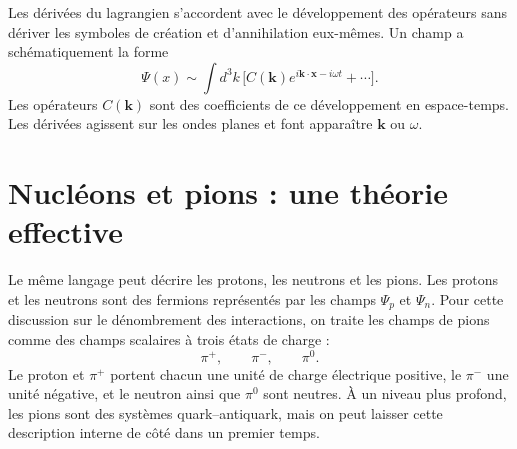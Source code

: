 \begin{classroomqa}
\end{classroomqa}

Les dérivées du lagrangien s’accordent avec le développement des opérateurs sans dériver les symboles de création et d’annihilation eux-mêmes. Un champ a schématiquement la forme
\begin{equation}
\Psi(x)
\sim
\int d^3k\,
\bigl[
C(\mathbf k)e^{i\mathbf k\cdot\mathbf x-i\omega t}
+\cdots
\bigr].
\end{equation}
Les opérateurs \(C(\mathbf k)\) sont des coefficients de ce développement en espace-temps. Les dérivées agissent sur les ondes planes et font apparaître \(\mathbf k\) ou \(\omega\).

\begin{classroomqa}
\end{classroomqa}

\section{Nucléons et pions : une théorie effective}

Le même langage peut décrire les protons, les neutrons et les pions. Les protons et les neutrons sont des fermions représentés par les champs \(\Psi_p\) et \(\Psi_n\). Pour cette discussion sur le dénombrement des interactions, on traite les champs de pions comme des champs scalaires à trois états de charge :
\begin{equation}
\pi^+,
\qquad
\pi^-,
\qquad
\pi^0.
\end{equation}
Le proton et \(\pi^+\) portent chacun une unité de charge électrique positive, le \(\pi^-\) une unité négative, et le neutron ainsi que \(\pi^0\) sont neutres. À un niveau plus profond, les pions sont des systèmes quark--antiquark, mais on peut laisser cette description interne de côté dans un premier temps.


